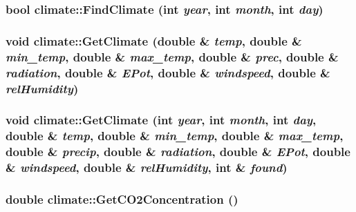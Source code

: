 \label{classclimate_adf16cf971faa070a3a1f52cca3f25686}
\hypertarget{classclimate_ac56dc5d8331fa48207444eb12bf8cfef}{
\subsubsection[{FindClimate}]{\setlength{\rightskip}{0pt plus 5cm}bool climate::FindClimate (int {\em year}, \/  int {\em month}, \/  int {\em day})}}
\label{classclimate_ac56dc5d8331fa48207444eb12bf8cfef}
\hypertarget{classclimate_a6b1e57f9fef9480cbd10b8f90a53828b}{
\subsubsection[{GetClimate}]{\setlength{\rightskip}{0pt plus 5cm}void climate::GetClimate (double \& {\em temp}, \/  double \& {\em min\_\-temp}, \/  double \& {\em max\_\-temp}, \/  double \& {\em prec}, \/  double \& {\em radiation}, \/  double \& {\em EPot}, \/  double \& {\em windspeed}, \/  double \& {\em relHumidity})}}
\label{classclimate_a6b1e57f9fef9480cbd10b8f90a53828b}
\hypertarget{classclimate_ab7d0b27317c6e374e52c945da88ef74a}{
\subsubsection[{GetClimate}]{\setlength{\rightskip}{0pt plus 5cm}void climate::GetClimate (int {\em year}, \/  int {\em month}, \/  int {\em day}, \/  double \& {\em temp}, \/  double \& {\em min\_\-temp}, \/  double \& {\em max\_\-temp}, \/  double \& {\em precip}, \/  double \& {\em radiation}, \/  double \& {\em EPot}, \/  double \& {\em windspeed}, \/  double \& {\em relHumidity}, \/  int \& {\em found})}}
\label{classclimate_ab7d0b27317c6e374e52c945da88ef74a}
\hypertarget{classclimate_a14e9a0d27f51b514217508b04f53ca04}{
\subsubsection[{GetCO2Concentration}]{\setlength{\rightskip}{0pt plus 5cm}double climate::GetCO2Concentration ()}}
\label{classclimate_a14e9a0d27f51b514217508b04f53ca04}

